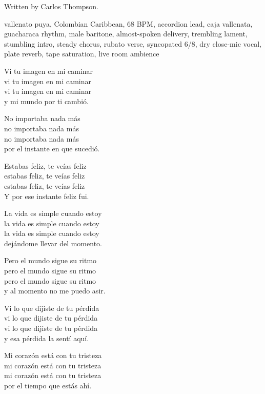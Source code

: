 
\label{sec:dejandome-llevar}
\begin{notes}
Written by Carlos Thompson.
\end{notes}
\begin{style}
vallenato puya, Colombian Caribbean, 68 BPM, accordion lead, caja vallenata, guacharaca rhythm, male baritone, almost-spoken delivery, trembling lament, stumbling intro, steady chorus, rubato verse, syncopated 6/8, dry close-mic vocal, plate reverb, tape saturation, live room ambience
\end{style}
\begin{lyrics}
Vi tu imagen en mi caminar\\
vi tu imagen en mi caminar\\
vi tu imagen en mi caminar\\
y mi mundo por ti cambió.

No importaba nada más\\
no importaba nada más\\
no importaba nada más\\
por el instante en que sucedió.

Estabas feliz, te veías feliz\\
estabas feliz, te veías feliz\\
estabas feliz, te veías feliz\\
Y por ese instante feliz fui.

La vida es simple cuando estoy\\
la vida es simple cuando estoy\\
la vida es simple cuando estoy\\
dejándome llevar del momento.

Pero el mundo sigue su ritmo\\
pero el mundo sigue su ritmo\\
pero el mundo sigue su ritmo\\
y al momento no me puedo asir.

Vi lo que dijiste de tu pérdida\\
vi lo que dijiste de tu pérdida\\
vi lo que dijiste de tu pérdida\\
y esa pérdida la sentí aquí.

Mi corazón está con tu tristeza\\
mi corazón está con tu tristeza\\
mi corazón está con tu tristeza\\
por el tiempo que estás ahí.


\end{lyrics}
